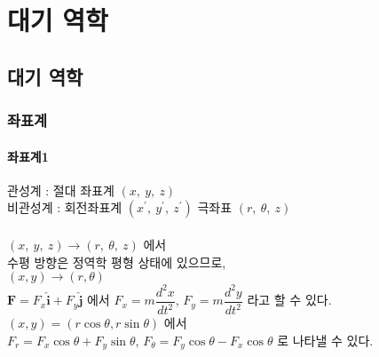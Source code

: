
\part{대기 역학}



\chapter{대기 역학}



\section{좌표계}

\subsection{좌표계1}

관성계 : 절대 좌표계 $ (x,~y,~z)$ \\
비관성계 : 회전좌표계 $ (x^{\prime},~y^{\prime},~z^{\prime})$ 
극좌표 $ (r,~\theta,~z)$\\
\\
$ (x,~y,~z) 	\rightarrow (r,~\theta,~z)$ 에서 \\
수평 방향은 정역학 평형 상태에 있으므로, \\	

$ (x, y) 	\rightarrow (r, \theta)$\\

$ \mathbf{F} = F_{x} \mathbf{\hat{i}}  + F_{y} \mathbf{\hat{j}} $ 에서 
$ F_{x} = m \dfrac{d^{2}x}{dt^{2}}$, 
$ F_{y} = m \dfrac{d^{2}y}{dt^{2}}$ 라고 할 수 있다.  \\

$ (x, y) = (r \cos \theta, r \sin \theta)$ 에서 \\
$ F_{r} = F_{x} \cos \theta + F_{y} \sin \theta $, 
$ F_{\theta} = F_{y} \cos \theta - F_{x} \cos \theta $ 로 나타낼 수 있다. \\


